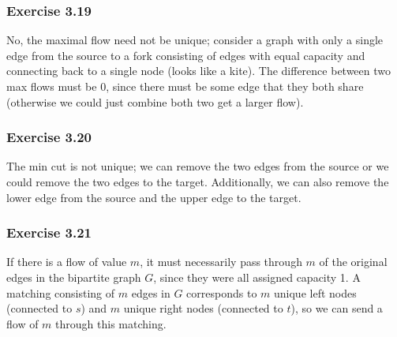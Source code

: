 \subsubsection{Exercise 3.19}
No, the maximal flow need not be unique; consider a graph with only a single edge from the source to a fork
consisting of edges with equal capacity and connecting back to a single node (looks like a kite). The 
difference between two max flows must be 0, since there must be some edge that they both share (otherwise we
could just combine both two get a larger flow).

\subsubsection{Exercise 3.20}
The min cut is not unique; we can remove the two edges from the source or we could remove the two edges to
the target. Additionally, we can also remove the lower edge from the source and the upper edge to the target.

\subsubsection{Exercise 3.21}
If there is a flow of value $m$, it must necessarily pass through $m$ of the original edges in the bipartite
graph $G$, since they were all assigned capacity 1. A matching consisting of $m$ edges in $G$ corresponds to
$m$ unique left nodes (connected to $s$) and  $m$ unique right nodes (connected to $t $), so we can send a 
flow of $m$ through this matching.
